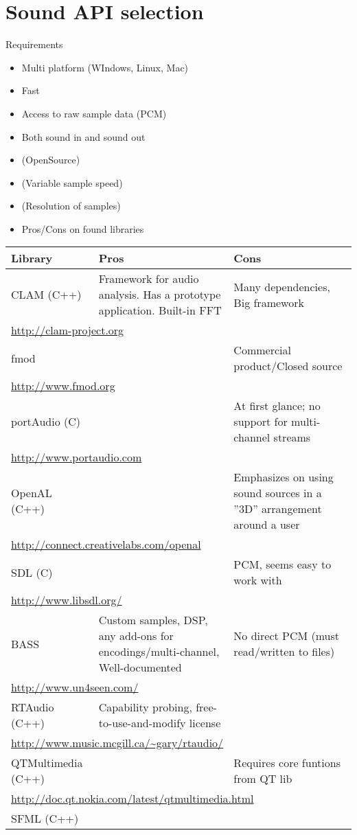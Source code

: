 \chapter{Sound API selection}\label{chap:lib}
Requirements
\begin{itemize}
\item Multi platform (WIndows, Linux, Mac)
\item Fast
\item Access to raw sample data (PCM)
\item Both sound in and sound out
\item(OpenSource)
\item(Variable sample speed)
\item(Resolution of samples)
\item Pros/Cons on found libraries
\end{itemize}

\begin{table}
\centering
\begin{tabularx}{\textwidth}{lXX}
Library & Pros & Cons\\
\midrule
CLAM (C++) & Framework for audio analysis. Has a prototype application. Built-in FFT & Many dependencies, Big framework\\
\multicolumn{3}{l}{\url{http://clam-project.org}}\\
\midrule
fmod & & Commercial product/Closed source\\
\multicolumn{3}{l}{\url{http://www.fmod.org}}\\
\midrule
portAudio (C) & & At first glance; no support for multi-channel streams\\
\multicolumn{3}{l}{\url{http://www.portaudio.com}}\\
\midrule
OpenAL (C++)& & Emphasizes on using sound sources in a ''3D'' arrangement around a user\\
\multicolumn{3}{l}{\url{http://connect.creativelabs.com/openal}}\\
\midrule
SDL (C) & & PCM, seems easy to work with \\
\multicolumn{3}{l}{\url{http://www.libsdl.org/}}\\
\midrule
BASS & Custom samples, DSP,  any add-ons for encodings/multi-channel, Well-documented & No direct PCM (must read/written to files)\\
\multicolumn{3}{l}{\url{http://www.un4seen.com/}}\\
\midrule
RTAudio (C++) & Capability probing, free-to-use-and-modify license & \\
\multicolumn{3}{l}{\url{http://www.music.mcgill.ca/~gary/rtaudio/}}\\
\midrule
QTMultimedia (C++) & & Requires core funtions from QT lib\\
\multicolumn{3}{l}{\url{http://doc.qt.nokia.com/latest/qtmultimedia.html}}\\
\midrule
SFML (C++) & & 
\end{tabularx}
\end{table}